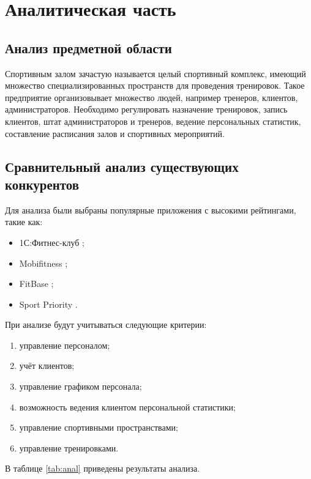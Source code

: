 \chapter{Аналитическая часть}

\section{Анализ предметной области}

Спортивным залом зачастую называется целый спортивный комплекс, имеющий множество специализированных пространств 
для проведения тренировок. Такое предприятие организовывает множество людей, например тренеров, клиентов, 
администраторов. Необходимо регулировать назначение тренировок, запись клиентов, штат администраторов и тренеров,
ведение персональных статистик, составление расписания залов и спортивных мероприятий.

\section{Сравнительный анализ существующих конкурентов}

Для анализа были выбраны популярные приложения с высокими рейтингами, такие как:

\begin{itemize}[label=—]
	\item 1С:Фитнес-клуб \cite{1cfitness};
	\item Mobifitness \cite{mobifitness};
	\item FitBase \cite{fitbase};
	\item Sport Priority \cite{sportpriority}.
\end{itemize}

При анализе будут учитываться следующие критерии:

\begin{enumerate}
	\item управление персоналом;
	\item учёт клиентов;
	\item управление графиком персонала;
	\item возможность ведения клиентом персональной статистики;
	\item управление спортивными пространствами;
	\item управление тренировками.
\end{enumerate}

В таблице \ref{tab:anal} приведены результаты анализа.


